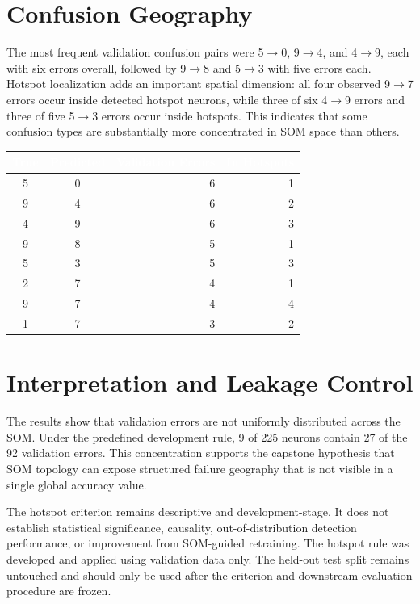 \documentclass[11pt]{article}
\begin{document}
\section{Confusion Geography}
The most frequent validation confusion pairs were 5$\rightarrow$0, 9$\rightarrow$4, and 4$\rightarrow$9, each with six errors overall, followed by 9$\rightarrow$8 and 5$\rightarrow$3 with five errors each. Hotspot localization adds an important spatial dimension: all four observed 9$\rightarrow$7 errors occur inside detected hotspot neurons, while three of six 4$\rightarrow$9 errors and three of five 5$\rightarrow$3 errors occur inside hotspots. This indicates that some confusion types are substantially more concentrated in SOM space than others.

\begin{table}[H]
\centering
\small
\begin{tabular}{|c|c|r|r|}
\hline
\rowcolor{TableHeader}
\textcolor{white}{\textbf{True}} & \textcolor{white}{\textbf{Predicted}} & \textcolor{white}{\textbf{Validation Errors}} & \textcolor{white}{\textbf{In Hotspots}} \\
\hline
5 & 0 & 6 & 1 \\
9 & 4 & 6 & 2 \\
4 & 9 & 6 & 3 \\
9 & 8 & 5 & 1 \\
5 & 3 & 5 & 3 \\
2 & 7 & 4 & 1 \\
9 & 7 & 4 & 4 \\
1 & 7 & 3 & 2 \\
\hline
\end{tabular}
\end{table}

\section{Interpretation and Leakage Control}
The results show that validation errors are not uniformly distributed across the SOM. Under the predefined development rule, 9 of 225 neurons contain 27 of the 92 validation errors. This concentration supports the capstone hypothesis that SOM topology can expose structured failure geography that is not visible in a single global accuracy value.

The hotspot criterion remains descriptive and development-stage. It does not establish statistical significance, causality, out-of-distribution detection performance, or improvement from SOM-guided retraining. The hotspot rule was developed and applied using validation data only. The held-out test split remains untouched and should only be used after the criterion and downstream evaluation procedure are frozen.
\end{document}
